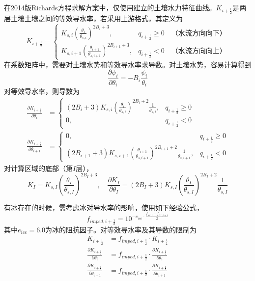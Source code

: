 在2014版Richards方程求解方案中，仅使用\citet{campbell1974}建立的土壤水力特征曲线。$K_{i+\frac{1}{2}}$是两层土壤土壤之间的等效导水率，若采用上游格式，其定义为
\begin{equation}
    K_{i+\frac{1}{2}}=
    \begin{cases}
       K_{s,i}\left(\frac{\theta_{i}}{\theta_{s,i}}\right)^{2 B_i+3},
       & q_{i+\frac{1}{2}} \geq 0 \quad \mbox{（水流方向向下）}\\ 
       K_{s,i+1}\left(\frac{\theta_{i+1}}{\theta_{s,i+1}}\right)^{2 B_{i+1}+3},
       & q_{i+\frac{1}{2}} < 0 \quad \mbox{（水流方向向上）}
    \end{cases}
\end{equation}
在系数矩阵中，需要对土壤水势和等效导水率求导数。对土壤水势，容易计算得到
\begin{equation}
\frac{\partial \psi_{i}}{\partial \theta_{i}}=-B_i \frac{\psi_{i}}{\theta_{i}}
\end{equation}
对等效导水率，则导数为
\begin{align}
\frac{\partial K_{i+\frac{1}{2}}}{\partial \theta_{i}} & = 
\begin{cases}
  \left(2B_i+3\right) K_{s,i}\left(\frac{\theta_{i}}{\theta_{s,i}}\right)^{2B_i+2} 
    \frac{1}{\theta_{s,i}}, & q_{i+\frac{1}{2}} \geq 0 \\ 
   0, & q_{i+\frac{1}{2}} < 0 
  \end{cases}
\\
\frac{\partial K_{i+\frac{1}{2}}}{\partial \theta_{i+1}} & = 
\begin{cases}
     0, & q_{i+\frac{1}{2}} \geq 0 \\
     (2B_{i+1}+3) K_{s,i+1}\left(\frac{\theta_{i+1}}{\theta_{s,i+1}}\right)^{2B_{i+1}+2} \frac{1}{\theta_{ {s,i+1}}}, & q_{i+\frac{1}{2}} < 0 
   \end{cases}
\end{align}
对计算区域的底部（第$I$层），
\begin{equation}
K_{I}=K_{s,I}\left(\frac{\theta_{I}}{\theta_{s,I}}\right)^{2B_I+3}, \quad \frac{\partial K_{I}}
{\partial \theta_{I}} = (2B_I+3) K_{s,I}\left(\frac{\theta_{I}}{\theta_{s,I}}\right)^{2B_I+2} \frac{1}{\theta_{s,I}}
\end{equation}

有冰存在的时候，需考虑冰对导水率的影响，使用如下经验公式，
\begin{equation}
    {f}_{imped,i+\frac{1}{2}}=10^{-e_{ice}\cdot\frac{f_{ice, i}+f_{ice, i+1}}{2}}
\end{equation}
其中$e_{ice}=6.0$为冰的阻抗因子。对等效导水率及其导数的限制为
\begin{equation}
\begin{aligned}
K_{i+\frac{1}{2}} & = {f}_{imped,i+\frac{1}{2}} \cdot K_{i+\frac{1}{2}} \\ 
\frac{\partial K_{i+\frac{1}{2}}}{\partial \theta_{i}}
    & = {f}_{imped,i+\frac{1}{2}} \cdot \frac{\partial K_{i+\frac{1}{2}}}{\partial \theta_{i}} \\ 
\frac{\partial K_{i+\frac{1}{2}}}{\partial \theta_{i+1}} & =
    {f}_{imped,i+\frac{1}{2}} \cdot \frac{\partial K_{i+\frac{1}{2}}}{\partial \theta_{i+1}}
    \end{aligned}
\end{equation}

